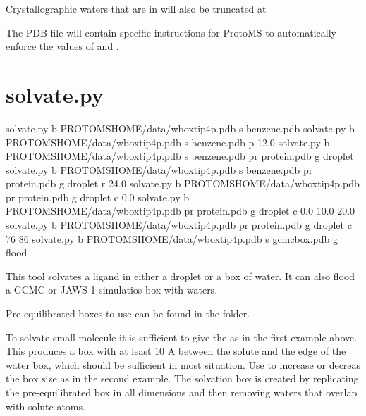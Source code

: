 \documentclass[letterpaper,10pt,english]{sphinxmanual}
\begin{document}
Crystallographic waters that are in  will also be truncated at 

The PDB file will contain specific instructions for ProtoMS to automatically enforce the values of   and .


\section{solvate.py}
\label{\detokenize{tools:solvate-py}}

%
\begin{sphinxVerbatim}[commandchars=\\\{\}]
solvate.py \PYGZhy{}b \PYGZdl{}PROTOMSHOME/data/wbox\PYGZus{}tip4p.pdb \PYGZhy{}s benzene.pdb
solvate.py \PYGZhy{}b \PYGZdl{}PROTOMSHOME/data/wbox\PYGZus{}tip4p.pdb \PYGZhy{}s benzene.pdb \PYGZhy{}p 12.0
solvate.py \PYGZhy{}b \PYGZdl{}PROTOMSHOME/data/wbox\PYGZus{}tip4p.pdb \PYGZhy{}s benzene.pdb \PYGZhy{}pr protein.pdb \PYGZhy{}g droplet
solvate.py \PYGZhy{}b \PYGZdl{}PROTOMSHOME/data/wbox\PYGZus{}tip4p.pdb \PYGZhy{}s benzene.pdb \PYGZhy{}pr protein.pdb \PYGZhy{}g droplet \PYGZhy{}r 24.0
solvate.py \PYGZhy{}b \PYGZdl{}PROTOMSHOME/data/wbox\PYGZus{}tip4p.pdb \PYGZhy{}pr protein.pdb \PYGZhy{}g droplet \PYGZhy{}c 0.0
solvate.py \PYGZhy{}b \PYGZdl{}PROTOMSHOME/data/wbox\PYGZus{}tip4p.pdb \PYGZhy{}pr protein.pdb \PYGZhy{}g droplet \PYGZhy{}c \PYGZdq{}0.0 10.0 20.0\PYGZdq{}
solvate.py \PYGZhy{}b \PYGZdl{}PROTOMSHOME/data/wbox\PYGZus{}tip4p.pdb \PYGZhy{}pr protein.pdb \PYGZhy{}g droplet \PYGZhy{}c \PYGZdq{}76 86\PYGZdq{}
solvate.py \PYGZhy{}b \PYGZdl{}PROTOMSHOME/data/wbox\PYGZus{}tip4p.pdb \PYGZhy{}s gcmc\PYGZus{}box.pdb \PYGZhy{}g flood
\end{sphinxVerbatim}


This tool solvates a ligand in either a droplet or a box of water. It can also flood a GCMC or JAWS-1 simulatios box with waters.

Pre-equilibrated boxes to use can be found in the  folder.

To solvate small molecule it is sufficient to give the  as in the first example above. This produces a box with at least 10 A between the solute and the edge of the water box, which should be sufficient in most situation. Use  to increase or decreas the box size as in the second example. The solvation box is created by replicating the pre-equilibrated box in all dimensions and then removing waters that overlap with solute atoms.
\end{document}
